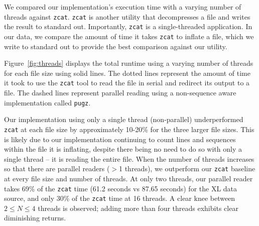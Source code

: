 We compared our \ireader implementation's execution time with a varying number
of threads against \texttt{zcat}. \texttt{zcat} is another \zlib utility that
decompresses a \gzip file and writes the result to standard out. Importantly,
\texttt{zcat} is a single-threaded application. In our data, we compare the
amount of time it takes \texttt{zcat} to inflate a file, which we write to
standard out to provide the best comparison against our \ireader utility.

Figure~\ref{fig:threads} displays the total \ireader runtime using a varying
number of threads for each file size using solid lines. The dotted lines
represent the amount of time it took to use the \texttt{zcat} tool to read the
file in serial and redirect its output to a file. The dashed lines represent
parallel \gzip reading using a non-sequence aware implementation called
\texttt{pugz}.

Our \ireader implementation using only a single thread (non-parallel) underperformed
\texttt{zcat} at each file size by approximately 10-20\% for the three larger
file sizes. This is likely due to our implementation continuing to count lines
and sequences within the \gzip file it is inflating, despite there being no need
to do so with only a single thread -- it is reading the entire file. When the
number of threads increases so that there are parallel readers ($>$1 threads),
we outperform our \texttt{zcat} baseline at every file size and number of
threads. At only two threads, our parallel reader takes 69\% of the
\texttt{zcat} time (61.2 seconds vs 87.65 seconds) for the XL data source, and
only 30\% of the \texttt{zcat} time at 16 threads. A clear knee between $2 \leq
N \leq 4$ threads is observed; adding more than four threads exhibits clear
diminishing returns. 
